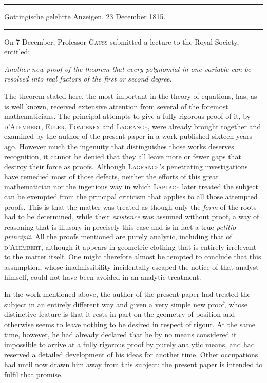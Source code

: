 \begin{center}
\rule{0.65\linewidth}{0.4pt}\par
Göttingische gelehrte Anzeigen. 23 December 1815.\par
\rule{0.65\linewidth}{0.4pt}
\end{center}

On 7 December, Professor \textsc{Gauss} submitted a lecture to the Royal Society, entitled:

\begin{center}
\emph{Another new proof of the theorem that every polynomial in one variable can be resolved into real factors of the first or second degree.}
\end{center}

The theorem stated here, the most important in the theory of equations, has, as is well known, received extensive attention from several of the foremost mathematicians. The principal attempts to give a fully rigorous proof of it, by \textsc{d'Alembert}, \textsc{Euler}, \textsc{Foncenex} and \textsc{Lagrange}, were already brought together and examined by the author of the present paper in a work published sixteen years ago. However much the ingenuity that distinguishes those works deserves recognition, it cannot be denied that they all leave more or fewer gaps that destroy their force as proofs. Although \textsc{Lagrange}'s penetrating investigations have remedied most of those defects, neither the efforts of this great mathematician nor the ingenious way in which \textsc{Laplace} later treated the subject can be exempted from the principal criticism that applies to all those attempted proofs. This is that the matter was treated as though only the \emph{form} of the roots had to be determined, while their \emph{existence} was assumed without proof,
a way of reasoning that is illusory in precisely this case and is in fact a true \emph{petitio principii}. All the proofs mentioned are purely analytic, including that of \textsc{d'Alembert}, although it appears in geometric clothing that is entirely irrelevant to the matter itself. One might therefore almost be tempted to conclude that this assumption, whose inadmissibility incidentally escaped the notice of that analyst himself, could not have been avoided in an analytic treatment.

In the work mentioned above, the author of the present paper had treated the subject in an entirely different way and given a very simple new proof, whose distinctive feature is that it rests in part on the geometry of position and otherwise seems to leave nothing to be desired in respect of rigour. At the same time, however, he had already declared that he by no means considered it impossible to arrive at a fully rigorous proof by purely analytic means, and had reserved a detailed development of his ideas for another time. Other occupations had until now drawn him away from this subject: the present paper is intended to fulfil that promise.

